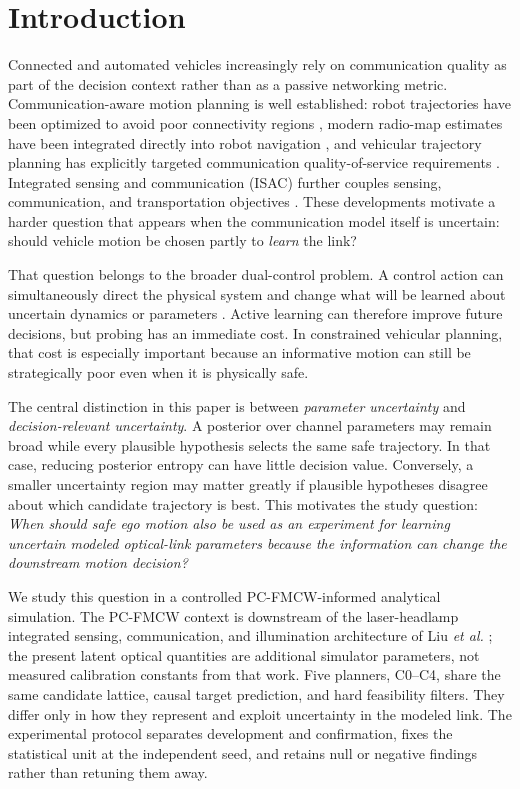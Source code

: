 \documentclass[journal]{IEEEtran}
\begin{document}
\section{Introduction}
Connected and automated vehicles increasingly rely on communication quality as part of the decision context rather than as a passive networking metric. Communication-aware motion planning is well established: robot trajectories have been optimized to avoid poor connectivity regions \cite{ghaffarkhah2011}, modern radio-map estimates have been integrated directly into robot navigation \cite{gordon2026}, and vehicular trajectory planning has explicitly targeted communication quality-of-service requirements \cite{ullah2025}. Integrated sensing and communication (ISAC) further couples sensing, communication, and transportation objectives \cite{cheng2022,jin2026}. These developments motivate a harder question that appears when the communication model itself is uncertain: should vehicle motion be chosen partly to \emph{learn} the link?

That question belongs to the broader dual-control problem. A control action can simultaneously direct the physical system and change what will be learned about uncertain dynamics or parameters \cite{barshalom1974,mesbah2018}. Active learning can therefore improve future decisions, but probing has an immediate cost. In constrained vehicular planning, that cost is especially important because an informative motion can still be strategically poor even when it is physically safe.

The central distinction in this paper is between \emph{parameter uncertainty} and \emph{decision-relevant uncertainty}. A posterior over channel parameters may remain broad while every plausible hypothesis selects the same safe trajectory. In that case, reducing posterior entropy can have little decision value. Conversely, a smaller uncertainty region may matter greatly if plausible hypotheses disagree about which candidate trajectory is best. This motivates the study question: \emph{When should safe ego motion also be used as an experiment for learning uncertain modeled optical-link parameters because the information can change the downstream motion decision?}

We study this question in a controlled PC-FMCW-informed analytical simulation. The PC-FMCW context is downstream of the laser-headlamp integrated sensing, communication, and illumination architecture of Liu \emph{et al.} \cite{liu2026}; the present latent optical quantities are additional simulator parameters, not measured calibration constants from that work. Five planners, C0--C4, share the same candidate lattice, causal target prediction, and hard feasibility filters. They differ only in how they represent and exploit uncertainty in the modeled link. The experimental protocol separates development and confirmation, fixes the statistical unit at the independent seed, and retains null or negative findings rather than retuning them away.
\end{document}
